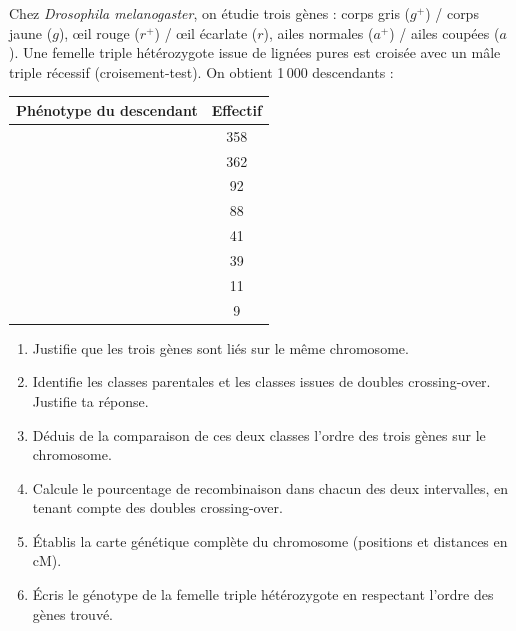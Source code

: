 \documentclass[11pt]{article}
\begin{document}
\begin{exercice}
Chez \emph{Drosophila melanogaster}, on étudie trois gènes : corps gris ($g^+$) / corps jaune ($g$), œil rouge ($r^+$) / œil écarlate ($r$), ailes normales ($a^+$) / ailes coupées ($a$). Une femelle triple hétérozygote issue de lignées pures est croisée avec un mâle triple récessif (croisement-test). On obtient 1\,000 descendants :
\begin{center}
\begin{tabular}{|l|c|}
\hline
\rowcolor{popblueL} Phénotype du descendant & Effectif \\
\hline
[gris, rouge, normales] & 358 \\
\hline
[jaune, écarlate, coupées] & 362 \\
\hline
[gris, écarlate, coupées] & 92 \\
\hline
[jaune, rouge, normales] & 88 \\
\hline
[gris, rouge, coupées] & 41 \\
\hline
[jaune, écarlate, normales] & 39 \\
\hline
[gris, écarlate, normales] & 11 \\
\hline
[jaune, rouge, coupées] & 9 \\
\hline
\end{tabular}
\end{center}
\begin{enumerate}
\item Justifie que les trois gènes sont liés sur le même chromosome.
\item Identifie les classes parentales et les classes issues de doubles crossing-over. Justifie ta réponse.
\item Déduis de la comparaison de ces deux classes l'ordre des trois gènes sur le chromosome.
\item Calcule le pourcentage de recombinaison dans chacun des deux intervalles, en tenant compte des doubles crossing-over.
\item Établis la carte génétique complète du chromosome (positions et distances en cM).
\item Écris le génotype de la femelle triple hétérozygote en respectant l'ordre des gènes trouvé.
\end{enumerate}
\end{exercice}
\end{document}

